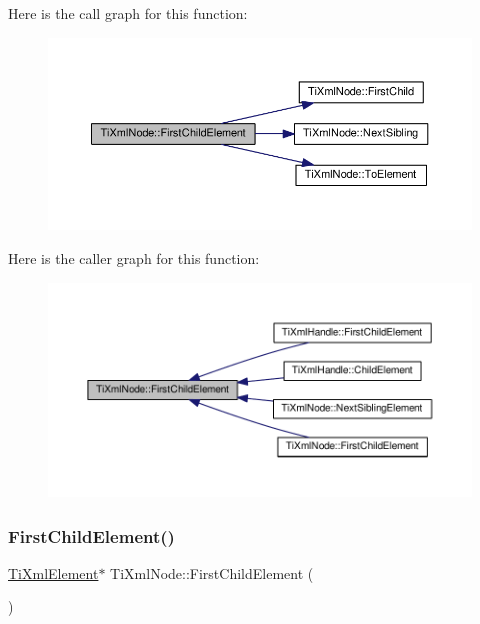 Here is the call graph for this function\+:
\nopagebreak
\begin{figure}[H]
\begin{center}
\leavevmode
\includegraphics[width=350pt]{class_ti_xml_node_a12c973e1da9e90a178924b8ea5a5f4d1_cgraph}
\end{center}
\end{figure}
Here is the caller graph for this function\+:
\nopagebreak
\begin{figure}[H]
\begin{center}
\leavevmode
\includegraphics[width=350pt]{class_ti_xml_node_a12c973e1da9e90a178924b8ea5a5f4d1_icgraph}
\end{center}
\end{figure}
\mbox{\label{class_ti_xml_node_aa0fecff1f3866ab33a8a25506e95db1d}} 
\subsubsection{\texorpdfstring{First\+Child\+Element()}{FirstChildElement()}\hspace{0.1cm}{\footnotesize\ttfamily [2/4]}}
{\footnotesize\ttfamily \hyperlink{class_ti_xml_element}{Ti\+Xml\+Element}$\ast$ Ti\+Xml\+Node\+::\+First\+Child\+Element (\begin{DoxyParamCaption}{ }\end{DoxyParamCaption})\hspace{0.3cm}{\ttfamily [inline]}}


